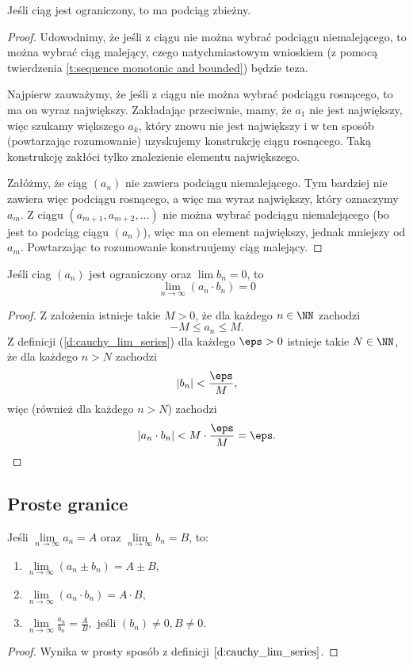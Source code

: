 \begin{theorem}
    Jeśli ciąg jest ograniczony, to ma podciąg zbieżny.
\end{theorem}
\begin{proof}
    Udowodnimy, że jeśli z ciągu nie można wybrać podciągu niemalejącego, to można wybrać ciąg malejący, czego natychmiastowym wnioskiem (z pomocą twierdzenia \ref{t:sequence monotonic and bounded}) będzie teza.

    Najpierw zauważymy, że jeśli z ciągu nie można wybrać podciągu rosnącego, to ma on wyraz największy. Zakładając przeciwnie, mamy, że $a_1$ nie jest największy, więc szukamy większego $a_k$, który znowu nie jest największy i w ten sposób (powtarzając rozumowanie) uzyskujemy konstrukcję ciągu rosnącego. Taką konstrukcję zakłóci tylko znalezienie elementu największego.

    Załóżmy, że ciąg $(a_n)$ nie zawiera podciągu niemalejącego. Tym bardziej nie zawiera więc podciągu rosnącego, a więc ma wyraz największy, który oznaczymy $a_m$. Z ciągu $(a_{m+1}, a_{m+2}, \ldots)$ nie można wybrać podciągu niemalejącego (bo jest to podciąg ciągu $(a_n)$), więc ma on element największy, jednak mniejszy od $a_m$. Powtarzając to rozumowanie konstruujemy ciąg malejący.
\end{proof}

\begin{theorem}
    \label{t:sequence bounded and convergent to 0}
    Jeśli ciag $(a_n)$ jest ograniczony oraz $\lim b_n = 0$, to
    \[ \lim_{n \to \infty} (a_n \cdot b_n) = 0 \]
\end{theorem}
\begin{proof}
    Z założenia istnieje takie $M > 0$, że dla każdego $n \in \NN$ zachodzi
    \[ -M \leq a_n \leq M. \]
    Z definicji (\ref{d:cauchy_lim_series}) dla każdego $\eps > 0$ istnieje takie $N \in \NN$, że dla każdego $n > N$ zachodzi
    \[ |b_n| < \frac{\eps}{M}, \]
    więc (również dla każdego $n > N$) zachodzi
    \[ |a_n \cdot b_n| < M \cdot \frac{\eps}{M} = \eps. \]
\end{proof}

\subsection{Proste granice}
\begin{theorem}
    Jeśli $\lim\limits_{n \to \infty} a_n = A$ oraz $\lim\limits_{n \to \infty} b_n = B$, to:
    \begin{enumerate}
        \item $\lim\limits_{n \to \infty} (a_n \pm b_n) = A \pm B,$
        \item $\lim\limits_{n \to \infty} (a_n \cdot b_n) = A \cdot B,$
        \item $\lim\limits_{n \to \infty} \frac{a_n}{b_n} = \frac{A}{B},$ jeśli $(b_n) \neq 0, B \neq 0$.
    \end{enumerate}
\end{theorem}
\begin{proof}
    Wynika w prosty sposób z definicji $\ref{d:cauchy_lim_series}$.
\end{proof}

